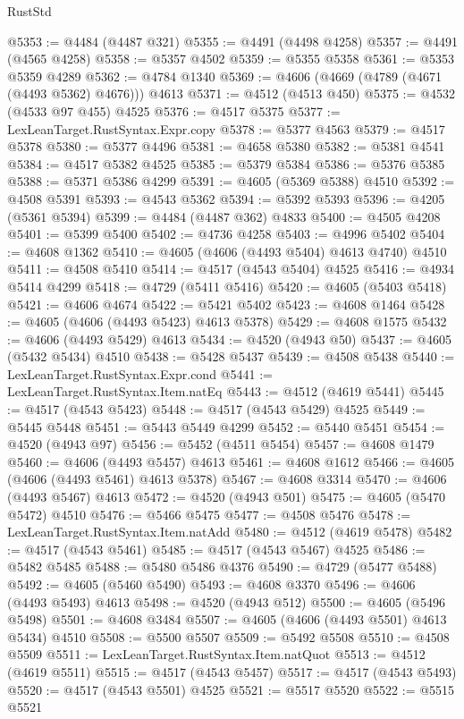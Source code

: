 \begin{lexlean}{RustStd}
\begin{coremodule}
@5353 := @4484 (@4487 @321)
@5355 := @4491 (@4498 @4258)
@5357 := @4491 (@4565 @4258)
@5358 := @5357 @4502
@5359 := @5355 @5358
@5361 := @5353 @5359 @4289
@5362 := @4784 @1340
@5369 := @4606 (@4669 (@4789 (@4671 (@4493 @5362) @4676))) @4613
@5371 := @4512 (@4513 @450)
@5375 := @4532 (@4533 @97 @455) @4525
@5376 := @4517 @5375
@5377 := LexLeanTarget.RustSyntax.Expr.copy
@5378 := @5377 @4563
@5379 := @4517 @5378
@5380 := @5377 @4496
@5381 := @4658 @5380
@5382 := @5381 @4541
@5384 := @4517 @5382 @4525
@5385 := @5379 @5384
@5386 := @5376 @5385
@5388 := @5371 @5386 @4299
@5391 := @4605 (@5369 @5388) @4510
@5392 := @4508 @5391
@5393 := @4543 @5362
@5394 := @5392 @5393
@5396 := @4205 (@5361 @5394)
@5399 := @4484 (@4487 @362) @4833
@5400 := @4505 @4208
@5401 := @5399 @5400
@5402 := @4736 @4258
@5403 := @4996 @5402
@5404 := @4608 @1362
@5410 := @4605 (@4606 (@4493 @5404) @4613 @4740) @4510
@5411 := @4508 @5410
@5414 := @4517 (@4543 @5404) @4525
@5416 := @4934 @5414 @4299
@5418 := @4729 (@5411 @5416)
@5420 := @4605 (@5403 @5418)
@5421 := @4606 @4674
@5422 := @5421 @5402
@5423 := @4608 @1464
@5428 := @4605 (@4606 (@4493 @5423) @4613 @5378)
@5429 := @4608 @1575
@5432 := @4606 (@4493 @5429) @4613
@5434 := @4520 (@4943 @50)
@5437 := @4605 (@5432 @5434) @4510
@5438 := @5428 @5437
@5439 := @4508 @5438
@5440 := LexLeanTarget.RustSyntax.Expr.cond
@5441 := LexLeanTarget.RustSyntax.Item.natEq
@5443 := @4512 (@4619 @5441)
@5445 := @4517 (@4543 @5423)
@5448 := @4517 (@4543 @5429) @4525
@5449 := @5445 @5448
@5451 := @5443 @5449 @4299
@5452 := @5440 @5451
@5454 := @4520 (@4943 @97)
@5456 := @5452 (@4511 @5454)
@5457 := @4608 @1479
@5460 := @4606 (@4493 @5457) @4613
@5461 := @4608 @1612
@5466 := @4605 (@4606 (@4493 @5461) @4613 @5378)
@5467 := @4608 @3314
@5470 := @4606 (@4493 @5467) @4613
@5472 := @4520 (@4943 @501)
@5475 := @4605 (@5470 @5472) @4510
@5476 := @5466 @5475
@5477 := @4508 @5476
@5478 := LexLeanTarget.RustSyntax.Item.natAdd
@5480 := @4512 (@4619 @5478)
@5482 := @4517 (@4543 @5461)
@5485 := @4517 (@4543 @5467) @4525
@5486 := @5482 @5485
@5488 := @5480 @5486 @4376
@5490 := @4729 (@5477 @5488)
@5492 := @4605 (@5460 @5490)
@5493 := @4608 @3370
@5496 := @4606 (@4493 @5493) @4613
@5498 := @4520 (@4943 @512)
@5500 := @4605 (@5496 @5498)
@5501 := @4608 @3484
@5507 := @4605 (@4606 (@4493 @5501) @4613 @5434) @4510
@5508 := @5500 @5507
@5509 := @5492 @5508
@5510 := @4508 @5509
@5511 := LexLeanTarget.RustSyntax.Item.natQuot
@5513 := @4512 (@4619 @5511)
@5515 := @4517 (@4543 @5457)
@5517 := @4517 (@4543 @5493)
@5520 := @4517 (@4543 @5501) @4525
@5521 := @5517 @5520
@5522 := @5515 @5521

\end{coremodule}
\end{lexlean}
